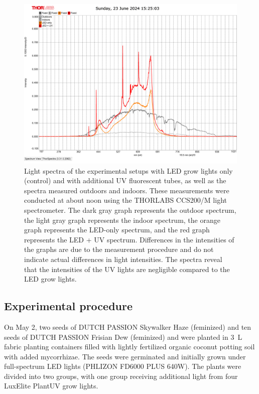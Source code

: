 \begin{figure}[H]
    \includegraphics[width=\linewidth]{../../data/light-spectra_outdoors_indoors_led_led+uv}
    \caption[Light spectra of the experimental setups and natural conditions]{Light spectra of the experimental setups with LED grow lights only (control) and with additional UV fluorescent tubes, as well as the spectra measured outdoors and indoors. These measurements were conducted at about noon using the THORLABS CCS200/M light spectrometer. The dark gray graph represents the outdoor spectrum, the light gray graph represents the indoor spectrum, the orange graph represents the LED-only spectrum, and the red graph represents the LED + UV spectrum. Differences in the intensities of the graphs are due to the measurement procedure and do not indicate actual differences in light intensities. The spectra reveal that the intensities of the UV lights are negligible compared to the LED grow lights.}
    \label{fig:light-spectra_outdoors_indoors_led_led+uv}
\end{figure}

\subsection{Experimental procedure}

On May 2, two seeds of DUTCH PASSION Skywalker Haze (feminized) and ten seeds of DUTCH PASSION Frisian Dew (feminized) and  were planted in \qty[mode=text]{3}{\L} fabric planting containers filled with lightly fertilized organic coconut potting soil with added mycorrhizae. The seeds were germinated and initially grown under full-spectrum LED lights (PHLIZON FD6000 PLUS 640W). The plants were divided into two groups, with one group receiving additional light from four LuxElite PlantUV grow lights.

